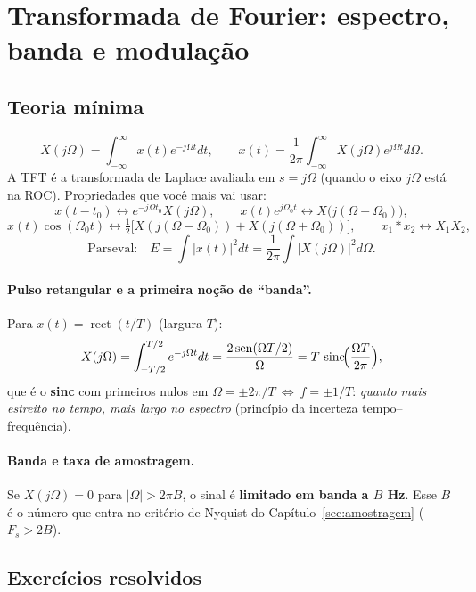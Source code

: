 \section{Transformada de Fourier: espectro, banda e modulação}

\subsection*{Teoria mínima}

\[
  X(j\Omega)=\int_{-\infty}^{\infty}x(t)e^{-j\Omega t}dt,\qquad
  x(t)=\frac{1}{2\pi}\int_{-\infty}^{\infty}X(j\Omega)e^{j\Omega t}d\Omega .
\]
A TFT é a transformada de Laplace avaliada em $s=j\Omega$ (quando o eixo
$j\Omega$ está na ROC). Propriedades que você mais vai usar:
\[
  x(t-t_0)\leftrightarrow e^{-j\Omega t_0}X(j\Omega),\qquad
  x(t)e^{j\Omega_0 t}\leftrightarrow X\bigl(j(\Omega-\Omega_0)\bigr),
\]
\[
  x(t)\cos(\Omega_0 t)\leftrightarrow
  \tfrac{1}{2}\bigl[X(j(\Omega-\Omega_0))+X(j(\Omega+\Omega_0))\bigr],
  \qquad
  x_1*x_2\leftrightarrow X_1X_2,
\]
\[
  \text{Parseval:}\quad E=\int|x(t)|^2dt=\frac{1}{2\pi}\int|X(j\Omega)|^2d\Omega .
\]

\paragraph{Pulso retangular e a primeira noção de ``banda''.} Para
$x(t)=\operatorname{rect}(t/T)$ (largura $T$):
\[
  X(j\Omega)=\int_{-T/2}^{T/2}e^{-j\Omega t}dt
            =\frac{2\operatorname{sen}(\Omega T/2)}{\Omega}
            =T\,\operatorname{sinc}\!\Bigl(\frac{\Omega T}{2\pi}\Bigr),
\]
que é o \textbf{sinc} com primeiros nulos em
$\Omega=\pm2\pi/T\ \Leftrightarrow\ f=\pm1/T$: \emph{quanto mais estreito no
tempo, mais largo no espectro} (princípio da incerteza tempo--frequência).

\paragraph{Banda e taxa de amostragem.} Se $X(j\Omega)=0$ para
$|\Omega|>2\pi B$, o sinal é \textbf{limitado em banda a $B$ Hz}. Esse $B$ é o
número que entra no critério de Nyquist do Capítulo~\ref{sec:amostragem}
($F_s>2B$).

\subsection*{Exercícios resolvidos}

